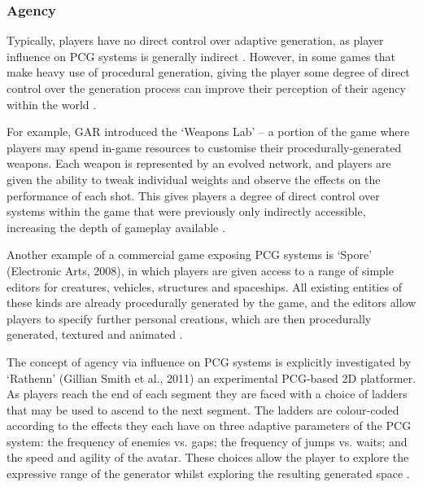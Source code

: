 \documentclass{acm_proc_article-sp}
\begin{document}
\subsubsection{Agency}
Typically, players have no direct control over adaptive generation, as player influence on PCG systems is generally indirect \cite{hamlet}.
However, in some games that make heavy use of procedural generation, giving the player some degree of direct control over the generation process can improve their perception of their agency within the world \cite{bartle2004designing}.

For example, GAR introduced the `Weapons Lab' -- a portion of the game where players may spend in-game resources to customise their procedurally-generated weapons. Each weapon is represented by an evolved network, and players are given the ability to tweak individual weights and observe the effects on the performance of each shot. This gives players a degree of direct control over systems within the game that were previously only indirectly accessible, increasing the depth of gameplay available \cite{Hastings:2010:IGE:1814256.1814264}.

Another example of a commercial game exposing PCG systems is `Spore' (Electronic Arts, 2008), in which players are given access to a range of simple editors for creatures, vehicles, structures and spaceships. All existing entities of these kinds are already procedurally generated by the game, and the editors allow players to specify further personal creations, which are then procedurally generated, textured and animated \cite{DeBry:2007:PPT:1278780.1278878,Perlin:2008:FVP:1401843.1401854}.

The concept of agency via influence on PCG systems is explicitly investigated by `Rathenn' (Gillian Smith et al., 2011) an experimental PCG-based 2D platformer. As players reach the end of each segment they are faced with a choice of ladders that may be used to ascend to the next segment. The ladders are colour-coded according to the effects they each have on three adaptive parameters of the PCG system: the frequency of enemies vs. gaps; the frequency of jumps vs. waits; and the speed and agility of the avatar. These choices allow the player to explore the expressive range of the generator whilst exploring the resulting generated space \cite{smith2011pcg}.
\end{document}
